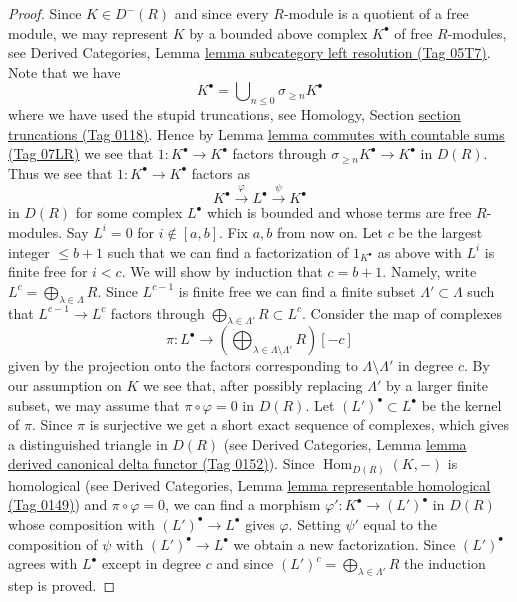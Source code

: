 \documentclass{amsart}
\theoremstyle{plain}
\theoremstyle{definition}
\theoremstyle{remark}
\numberwithin{equation}{subsection}
\def\Hom{\mathop{\mathrm{Hom}}\nolimits}
\begin{document}
\begin{proof}
\medskip\noindent
Since $K \in D^{-}(R)$ and since every $R$-module is a quotient of a free
module, we may represent $K$ by a bounded above complex $K^\bullet$
of free $R$-modules, see
Derived Categories, Lemma \href{https://stacks.math.columbia.edu/tag/05T7}{lemma subcategory left resolution (Tag 05T7)}.
Note that we have
$$
K^\bullet = \bigcup\nolimits_{n \leq 0} \sigma_{\geq n}K^\bullet
$$
where we have used the stupid truncations, see
Homology, Section \href{https://stacks.math.columbia.edu/tag/0118}{section truncations (Tag 0118)}.
Hence by Lemma \href{https://stacks.math.columbia.edu/tag/07LR}{lemma commutes with countable sums (Tag 07LR)} we see that
$1 : K^\bullet \to K^\bullet$ factors through
$\sigma_{\geq n}K^\bullet \to K^\bullet$ in $D(R)$.
Thus we see that $1 : K^\bullet \to K^\bullet$ factors as
$$
K^\bullet \xrightarrow{\varphi} L^\bullet \xrightarrow{\psi} K^\bullet
$$
in $D(R)$ for some complex $L^\bullet$ which is bounded and whose terms
are free $R$-modules. Say $L^i = 0$ for $i \not \in [a, b]$.
Fix $a, b$ from now on. Let $c$ be the largest integer $\leq b + 1$
such that we can find a factorization of $1_{K^\bullet}$ as above
with $L^i$ is finite free for $i < c$. We will show by induction that
$c = b + 1$. Namely, write $L^c = \bigoplus_{\lambda \in \Lambda} R$.
Since $L^{c - 1}$ is finite free we can find a finite subset
$\Lambda' \subset \Lambda$ such that $L^{c - 1} \to L^c$ factors
through $\bigoplus_{\lambda \in \Lambda'} R \subset L^c$. Consider the
map of complexes
$$
\pi :
L^\bullet
\longrightarrow
(\bigoplus\nolimits_{\lambda \in \Lambda \setminus \Lambda'} R)[-c]
$$
given by the projection onto the factors corresponding to
$\Lambda \setminus \Lambda'$ in degree $c$.
By our assumption on $K$ we see that, after possibly replacing $\Lambda'$ by
a larger finite subset, we may assume that $\pi \circ \varphi = 0$
in $D(R)$. Let $(L')^\bullet \subset L^\bullet$ be the kernel of $\pi$.
Since $\pi$ is surjective we get a short exact sequence of complexes,
which gives a distinguished triangle in $D(R)$ (see
Derived Categories, Lemma \href{https://stacks.math.columbia.edu/tag/0152}{lemma derived canonical delta functor (Tag 0152)}).
Since $\Hom_{D(R)}(K, -)$ is homological (see
Derived Categories, Lemma \href{https://stacks.math.columbia.edu/tag/0149}{lemma representable homological (Tag 0149)})
and $\pi \circ \varphi = 0$, we can find a morphism
$\varphi' : K^\bullet \to (L')^\bullet$ in $D(R)$ whose
composition with $(L')^\bullet \to L^\bullet$ gives $\varphi$.
Setting $\psi'$ equal to the composition of $\psi$ with
$(L')^\bullet \to L^\bullet$ we obtain a new factorization.
Since $(L')^\bullet$ agrees with $L^\bullet$ except in degree $c$
and since $(L')^c = \bigoplus_{\lambda \in \Lambda'} R$ the
induction step is proved.


\end{proof}
\end{document}

